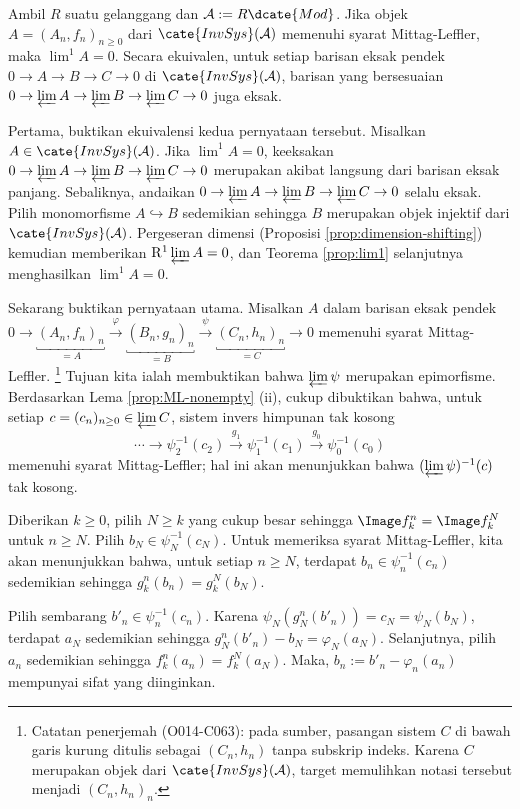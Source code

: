 \begin{proposisi}\label{prop:ML-exactness}
Ambil $R$ suatu gelanggang dan $\mathcal{A} := R\dcate{Mod}$. Jika objek
$A = (A_n, f_n)_{n \geq 0}$ dari
$\cate{InvSys}(\mathcal{A})$ memenuhi syarat Mittag-Leffler, maka
$\lim^1 A = 0$. Secara ekuivalen, untuk setiap barisan eksak pendek
$0 \to A \to B \to C \to 0$ di $\cate{InvSys}(\mathcal{A})$, barisan
yang bersesuaian $0 \to \varprojlim A \to \varprojlim B \to
\varprojlim C \to 0$ juga eksak.
\end{proposisi}
\begin{bukti}
Pertama, buktikan ekuivalensi kedua pernyataan tersebut. Misalkan
$A \in \cate{InvSys}(\mathcal{A})$. Jika $\lim^1 A = 0$, keeksakan
$0 \to \varprojlim A \to \varprojlim B \to \varprojlim C \to 0$
merupakan akibat langsung dari barisan eksak panjang. Sebaliknya,
andaikan $0 \to \varprojlim A \to \varprojlim B \to \varprojlim C \to 0$
selalu eksak. Pilih monomorfisme $A \hookrightarrow B$ sedemikian
sehingga $B$ merupakan objek injektif dari
$\cate{InvSys}(\mathcal{A})$. Pergeseran dimensi (Proposisi
\ref{prop:dimension-shifting}) kemudian memberikan
$\mathrm{R}^1 \varprojlim A = 0$, dan Teorema \ref{prop:lim1}
selanjutnya menghasilkan $\lim^1 A = 0$.

Sekarang buktikan pernyataan utama. Misalkan $A$ dalam barisan eksak
pendek
$0 \to \underbracket{(A_n, f_n)_n}_{= A} \xrightarrow{\varphi} \underbracket{(B_n, g_n)_n}_{= B} \xrightarrow{\psi} \underbracket{(C_n, h_n)_n}_{= C} \to 0$
memenuhi syarat Mittag-Leffler.
\footnote{Catatan penerjemah (O014-C063): pada sumber, pasangan sistem $C$ di bawah garis kurung ditulis sebagai $(C_n,h_n)$ tanpa subskrip indeks. Karena $C$ merupakan objek dari $\cate{InvSys}(\mathcal{A})$, target memulihkan notasi tersebut menjadi $(C_n,h_n)_n$.}
Tujuan kita ialah membuktikan bahwa $\varprojlim \psi$ merupakan
epimorfisme. Berdasarkan Lema \ref{prop:ML-nonempty} (ii), cukup dibuktikan
bahwa, untuk setiap $c = (c_n)_{n \geq 0} \in \varprojlim C$, sistem invers
himpunan tak kosong
\[ \cdots \to \psi_2^{-1}(c_2) \xrightarrow{g_1} \psi_1^{-1}(c_1) \xrightarrow{g_0} \psi_0^{-1}(c_0) \]
memenuhi syarat Mittag-Leffler; hal ini akan menunjukkan bahwa
$(\varprojlim \psi)^{-1}(c)$ tak kosong.

Diberikan $k \geq 0$, pilih $N \geq k$ yang cukup besar sehingga
$\Image f^n_k = \Image f^N_k$ untuk $n \geq N$. Pilih
$b_N \in \psi_N^{-1}(c_N)$. Untuk memeriksa syarat Mittag-Leffler,
kita akan menunjukkan bahwa, untuk setiap $n \geq N$, terdapat
$b_n \in \psi_n^{-1}(c_n)$ sedemikian sehingga
$g^n_k(b_n) = g^N_k(b_N)$.

Pilih sembarang $b'_n \in \psi_n^{-1}(c_n)$. Karena
$\psi_N\left( g^n_N(b'_n)\right) = c_N =
\psi_N\left(b_N \right)$, terdapat $a_N$ sedemikian sehingga
$g^n_N(b'_n) - b_N = \varphi_N(a_N)$. Selanjutnya, pilih $a_n$
sedemikian sehingga $f^n_k(a_n) = f^N_k(a_N)$. Maka,
$b_n := b'_n - \varphi_n(a_n)$ mempunyai sifat yang diinginkan.
\end{bukti}

